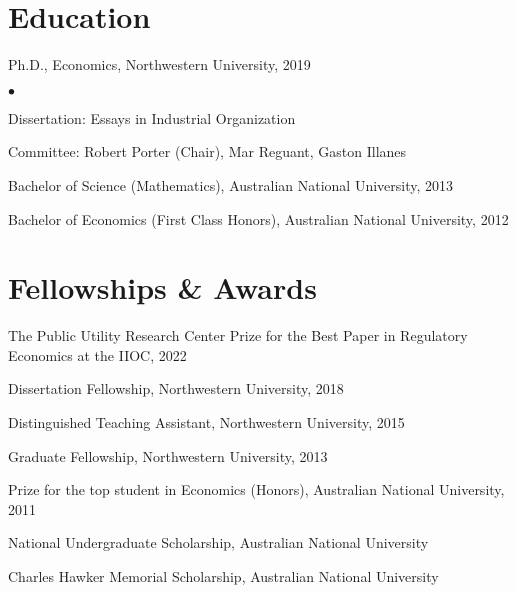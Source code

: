 \documentclass[margin,line]{res}
\newenvironment{list1}{
  \begin{list}{\ding{113}}{%
      \setlength{\itemsep}{.025in}
      \setlength{\parsep}{0in} \setlength{\parskip}{0in}
      \setlength{\topsep}{0in} \setlength{\partopsep}{0in}
      \setlength{\leftmargin}{0.17in}}}{\end{list}}
\newenvironment{list2}{
  \begin{list}{$\bullet$}{%
      \setlength{\itemsep}{0in}
      \setlength{\parsep}{0in} \setlength{\parskip}{0in}
      \setlength{\topsep}{0in} \setlength{\partopsep}{0in}
      \setlength{\leftmargin}{0.2in}}}{\end{list}}
\begin{document}
\begin{resume}
\section{ Education}\begin{tiny}

\end{tiny}
\begin{list1}
\item[] Ph.D., Economics, Northwestern University, 2019
	\begin{list2}
		\item[] Dissertation: Essays in Industrial Organization
		\item[] Committee: Robert Porter (Chair), Mar Reguant, Gaston Illanes
	\end{list2}
\item[] Bachelor of Science (Mathematics), Australian National University, 2013
\item[] Bachelor of Economics (First Class Honors), Australian National University, 2012
\end{list1}

\section{Fellowships \& Awards}
\begin{list1}
\item[] The Public Utility Research Center Prize for the Best Paper in Regulatory Economics at the IIOC, 2022
\item[] Dissertation Fellowship, Northwestern University, 2018
\item[] Distinguished Teaching Assistant, Northwestern University, 2015
\item[] Graduate Fellowship, Northwestern University, 2013
\item[] Prize for the top student in Economics (Honors), Australian National University, 2011
\item[] National Undergraduate Scholarship, Australian National University
\item[] Charles Hawker Memorial Scholarship, Australian National University
\end{list1}


\end{resume}
\end{document}
